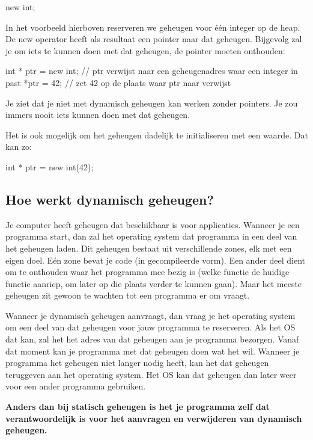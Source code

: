 \documentclass[11pt, oldfontcommands, oneside, a4paper]{memoir}
\begin{document}
\begin{code}
new int;
\end{code}

In het voorbeeld hierboven reserveren we geheugen voor \'e\'en integer op de heap. De new operator heeft als resultaat een pointer naar dat geheugen. Bijgevolg zal je om iets te kunnen doen met dat geheugen, de pointer moeten onthouden:

\begin{code}
int * ptr = new int; // ptr verwijst naar een geheugenadres waar een integer in past 
*ptr = 42; // zet 42 op de plaats waar ptr naar verwijst
\end{code}

Je ziet dat je niet met dynamisch geheugen kan werken zonder pointers. Je zou immers nooit iets kunnen doen met dat geheugen.

Het is ook mogelijk om het geheugen dadelijk te initialiseren met een waarde. Dat kan zo:

\begin{code}
int * ptr = new int(42);
\end{code}

\subsection{Hoe werkt dynamisch geheugen?}
Je computer heeft geheugen dat beschikbaar is voor applicaties. Wanneer je een programma start, dan zal het operating system dat programma in een deel van het geheugen laden. Dit geheugen bestaat uit verschillende zones, elk met een eigen doel. E\'en zone bevat je code (in gecompileerde vorm). Een ander deel dient om te onthouden waar het programma mee bezig is (welke functie de huidige functie aanriep, om later op die plaats verder te kunnen gaan). Maar het meeste geheugen zit gewoon te wachten tot een programma er om vraagt.

Wanneer je dynamisch geheugen aanvraagt, dan vraag je het operating system om een deel van dat geheugen voor jouw programma te reserveren. Als het OS dat kan, zal het het adres van dat geheugen aan je programma bezorgen. Vanaf dat moment kan je programma met dat geheugen doen wat het wil. Wanneer je programma het geheugen niet langer nodig heeft, kan het dat geheugen teruggeven aan het operating system. Het OS kan dat geheugen dan later weer voor een ander programma gebruiken.

\textbf{Anders dan bij statisch geheugen is het je programma zelf dat verantwoordelijk is voor het aanvragen en verwijderen van dynamisch geheugen.}
\end{document}
